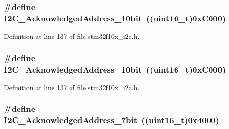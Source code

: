 \subsubsection[{\texorpdfstring{I2\+C\+\_\+\+Acknowledged\+Address\+\_\+10bit}{I2C_AcknowledgedAddress_10bit}}]{\setlength{\rightskip}{0pt plus 5cm}\#define I2\+C\+\_\+\+Acknowledged\+Address\+\_\+10bit~(({\bf uint16\+\_\+t})0x\+C000)}\hypertarget{group___i2_c__acknowledged__address_gaf0bb8f71795f046ad9f6c1fc7fe0fc53}{}\label{group___i2_c__acknowledged__address_gaf0bb8f71795f046ad9f6c1fc7fe0fc53}


Definition at line 137 of file stm32f10x\+\_\+i2c.\+h.

\subsubsection[{\texorpdfstring{I2\+C\+\_\+\+Acknowledged\+Address\+\_\+10bit}{I2C_AcknowledgedAddress_10bit}}]{\setlength{\rightskip}{0pt plus 5cm}\#define I2\+C\+\_\+\+Acknowledged\+Address\+\_\+10bit~(({\bf uint16\+\_\+t})0x\+C000)}\hypertarget{group___i2_c__acknowledged__address_gaf0bb8f71795f046ad9f6c1fc7fe0fc53}{}\label{group___i2_c__acknowledged__address_gaf0bb8f71795f046ad9f6c1fc7fe0fc53}


Definition at line 137 of file stm32f10x\+\_\+i2c.\+h.

\subsubsection[{\texorpdfstring{I2\+C\+\_\+\+Acknowledged\+Address\+\_\+7bit}{I2C_AcknowledgedAddress_7bit}}]{\setlength{\rightskip}{0pt plus 5cm}\#define I2\+C\+\_\+\+Acknowledged\+Address\+\_\+7bit~(({\bf uint16\+\_\+t})0x4000)}\hypertarget{group___i2_c__acknowledged__address_ga5e5ad2148f9da14457c7b59357acee97}{}\label{group___i2_c__acknowledged__address_ga5e5ad2148f9da14457c7b59357acee97}


